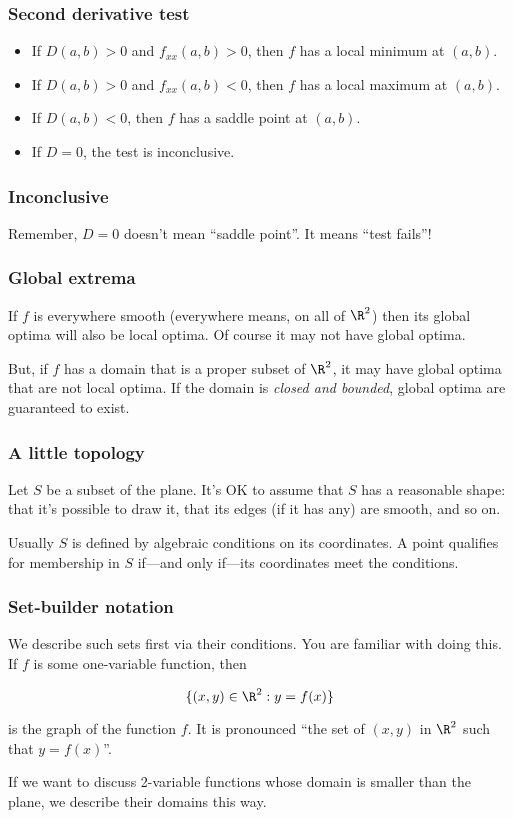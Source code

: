 \documentclass[11pt,ignorenonframetext,aspectratio=169,xcolor={svgnames}]{beamer}
\begin{document}
\begin{frame}\frametitle{Second derivative test}

\begin{itemize}

\item
  If $D(a,b) > 0$ and $f_{xx}(a,b) > 0$, then $f$ has a local minimum at
  $(a,b)$.
\item
  If $D(a,b) > 0$ and $f_{xx}(a,b) < 0$, then $f$ has a local maximum at
  $(a,b)$.
\item
  If $D(a,b) < 0$, then $f$ has a saddle point at $(a,b)$.
\item
  If $D = 0$, the test is inconclusive.
\end{itemize}

\end{frame}

\begin{frame}\frametitle{Inconclusive}

Remember, $D = 0$ doesn't mean ``saddle point''. It means ``test
fails''!

\end{frame}

\begin{frame}\frametitle{Global extrema}

If $f$ is everywhere smooth (everywhere means, on all of $\R^2$) then
its global optima will also be local optima. Of course it may not have
global optima.

But, if $f$ has a domain that is a proper subset of $\R^2$, it may have
global optima that are not local optima. If the domain is \emph{closed
and bounded}, global optima are guaranteed to exist.

\end{frame}

\begin{frame}\frametitle{A little topology}

Let $S$ be a subset of the plane. It's OK to assume that $S$ has a
reasonable shape: that it's possible to draw it, that its edges (if it
has any) are smooth, and so on.

Usually $S$ is defined by algebraic conditions on its coordinates. A
point qualifies for membership in $S$ if---and only if---its coordinates
meet the conditions.

\end{frame}

\begin{frame}\frametitle{Set-builder notation}

We describe such sets first via their conditions. You are familiar with
doing this. If $f$ is some one-variable function, then

\[ \{ (x,y) \in \R^2 : y = f(x) \} \]

is the graph of the function $f$. It is pronounced ``the set of $(x,y)$
in $\R^2$ such that $y = f(x)$''.

If we want to discuss 2-variable functions whose domain is smaller than
the plane, we describe their domains this way.

\end{frame}
\end{document}
